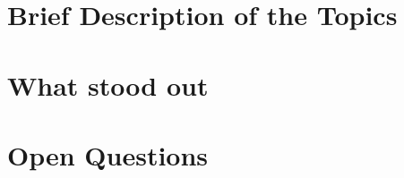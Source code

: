 \documentclass[11pt]{article}
\title{$TITLE}
\author{Bartosz}
\date{\today}
\begin{document}
\maketitle

\section*{Brief Description of the Topics}

\section*{What stood out}

\section*{Open Questions}
\end{document}
